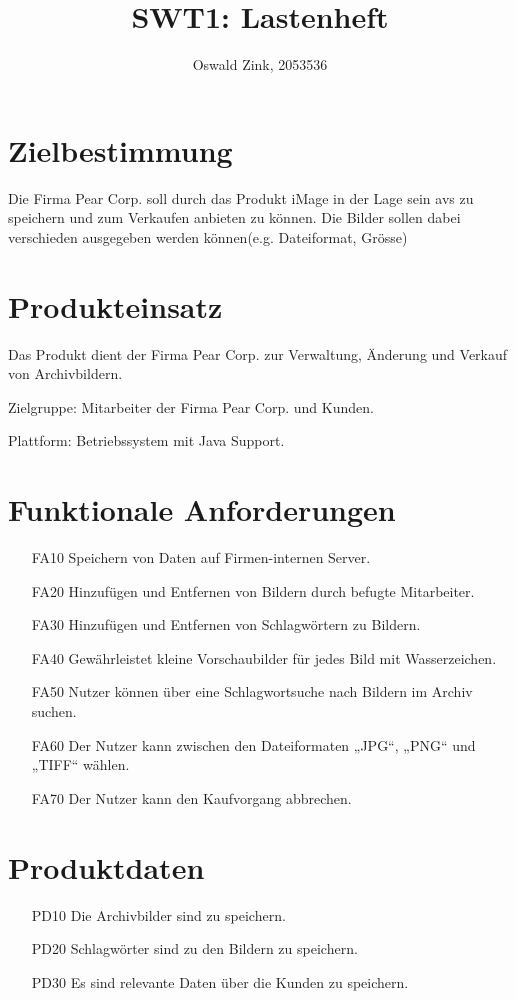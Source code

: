 \documentclass[parskip=full]{scrartcl}
\title{SWT1: Lastenheft}
\author{Oswald Zink, 2053536}
\begin{document}
\maketitle
\section{Zielbestimmung}
Die Firma Pear Corp. soll durch das Produkt iMage in der Lage sein \glspl{av} zu speichern und zum Verkaufen anbieten zu k\"onnen. Die Bilder sollen dabei verschieden ausgegeben werden k\"onnen(e.g. Dateiformat, Gr\"osse)

\section{Produkteinsatz}
Das Produkt dient der Firma Pear Corp. zur Verwaltung, \"Anderung und Verkauf von Archivbildern.

Zielgruppe: Mitarbeiter der Firma Pear Corp. und Kunden.

Plattform: Betriebssystem mit Java Support.

\section{Funktionale Anforderungen}
\begin{itemize}[nosep]
\item[FA10] Speichern von Daten auf Firmen-internen Server.
\item[FA20] Hinzuf\"ugen und Entfernen von Bildern durch befugte Mitarbeiter.
\item[FA30] Hinzuf\"ugen und Entfernen von Schlagw\"ortern zu Bildern.
\item[FA40] Gew\"ahrleistet kleine Vorschaubilder f\"ur jedes Bild mit Wasserzeichen.
\item[FA50] Nutzer k\"onnen über eine Schlagwortsuche nach Bildern im Archiv suchen.
\item[FA60] Der Nutzer kann zwischen den Dateiformaten „JPG“, „PNG“ und „TIFF“ wählen.
\item[FA70] Der Nutzer kann den Kaufvorgang abbrechen.
\end{itemize}

\section{Produktdaten}
\begin{itemize}[nosep]
\item[PD10] Die Archivbilder sind zu speichern.
\item[PD20] Schlagw\"orter sind zu den Bildern zu speichern.
\item[PD30] Es sind relevante Daten \"uber die Kunden zu speichern.
\end{itemize}
\end{document}
